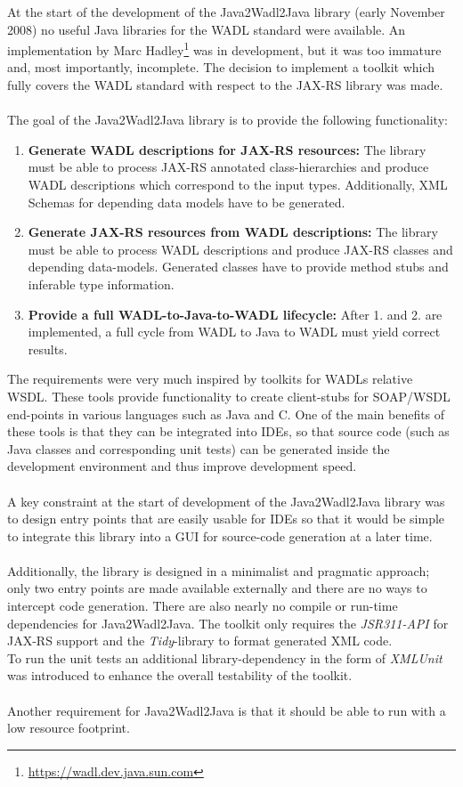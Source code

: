 At the start of the development of the Java2Wadl2Java library (early November 2008) no useful Java libraries for the WADL standard were available. An implementation by Marc Hadley\footnote{\url{https://wadl.dev.java.sun.com}} was in development, but it was too immature and, most importantly, incomplete. The decision to implement a toolkit which fully covers the WADL standard with respect to the JAX-RS library was made.
\\ \\
The goal of the Java2Wadl2Java library is to provide the following functionality:
\begin{enumerate}
\item{{\bf Generate WADL descriptions for JAX-RS resources:} 
The library must be able to process JAX-RS annotated class-hierarchies and produce WADL descriptions which correspond to the input types. Additionally, XML Schemas for depending data models have to be generated.} 
\item{{\bf Generate JAX-RS resources from WADL descriptions:}
The library must be able to process WADL descriptions and produce JAX-RS classes and depending data-models. Generated classes have to provide method stubs and inferable type information.}
\item{{\bf Provide a full WADL-to-Java-to-WADL lifecycle:}
After 1. and 2. are implemented, a full cycle from WADL to Java to WADL must yield correct results.}
\end{enumerate}
The requirements were very much inspired by toolkits for WADLs relative WSDL. These tools provide functionality to create client-stubs for SOAP/WSDL end-points in various languages such as Java and C. One of the main benefits of these tools is that they can be integrated into IDEs, so that source code (such as Java classes and corresponding unit tests) can be generated inside the development environment and thus improve development speed.
\\ \\
A key constraint at the start of development of the Java2Wadl2Java library was to design entry points that are easily usable for IDEs so that it would be simple to integrate this library into a GUI for source-code generation at a later time.
\\ \\
Additionally, the library is designed in a minimalist and pragmatic approach; only two entry points are made available externally and there are no ways to intercept code generation. There are also nearly no compile or run-time dependencies for Java2Wadl2Java. The toolkit only requires the \emph{JSR311-API} for JAX-RS support and the \emph{Tidy}-library to format generated XML code.
\\
To run the unit tests an additional library-dependency in the form of \emph{XMLUnit} was introduced to enhance the overall testability of the toolkit.
\\ \\
Another requirement for Java2Wadl2Java is that it should be able to run with a low resource footprint.